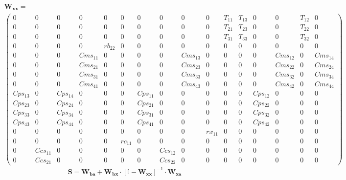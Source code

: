 \begin{multline*} \mathbf{W_{xx}}=\\\left(\begin{smallmatrix} 0 & 0 & 0 & 0 & 0 & 0 &
0 & 0 & 0 & 0 & T_{11} & T_{13} & 0 & 0 & T_{12} & 0 \\ 0 & 0 & 0 & 0
& 0 & 0 & 0 & 0 & 0 & 0 & T_{21} & T_{23} & 0 & 0 & T_{22} & 0 \\ 0 &
0 & 0 & 0 & 0 & 0 & 0 & 0 & 0 & 0 & T_{31} & T_{33} & 0 & 0 & T_{32} &
0 \\ 0 & 0 & 0 & 0 & rb_{22} & 0 & 0 & 0 & 0 & 0 & 0 & 0 & 0 & 0 & 0 &
0 \\ 0 & 0 & 0 & Cms_{11} & 0 & 0 & 0 & 0 & Cms_{13} & 0 & 0 & 0 & 0 &
Cms_{12} & 0 & Cms_{14} \\ 0 & 0 & 0 & Cms_{21} & 0 & 0 & 0 & 0 &
Cms_{23} & 0 & 0 & 0 & 0 & Cms_{22} & 0 & Cms_{24} \\ 0 & 0 & 0 &
Cms_{31} & 0 & 0 & 0 & 0 & Cms_{33} & 0 & 0 & 0 & 0 & Cms_{32} & 0 &
Cms_{34} \\ 0 & 0 & 0 & Cms_{41} & 0 & 0 & 0 & 0 & Cms_{43} & 0 & 0 &
0 & 0 & Cms_{42} & 0 & Cms_{44} \\ Cps_{13} & 0 & Cps_{14} & 0 & 0 & 0
& Cps_{11} & 0 & 0 & 0 & 0 & 0 & Cps_{12} & 0 & 0 & 0 \\ Cps_{23} & 0
& Cps_{24} & 0 & 0 & 0 & Cps_{21} & 0 & 0 & 0 & 0 & 0 & Cps_{22} & 0 &
0 & 0 \\ Cps_{33} & 0 & Cps_{34} & 0 & 0 & 0 & Cps_{31} & 0 & 0 & 0 &
0 & 0 & Cps_{32} & 0 & 0 & 0 \\ Cps_{43} & 0 & Cps_{44} & 0 & 0 & 0 &
Cps_{41} & 0 & 0 & 0 & 0 & 0 & Cps_{42} & 0 & 0 & 0 \\ 0 & 0 & 0 & 0 &
0 & 0 & 0 & 0 & 0 & rx_{11} & 0 & 0 & 0 & 0 & 0 & 0 \\ 0 & 0 & 0 & 0 &
0 & rc_{11} & 0 & 0 & 0 & 0 & 0 & 0 & 0 & 0 & 0 & 0 \\ 0 & Ccs_{11} &
0 & 0 & 0 & 0 & 0 & Ccs_{12} & 0 & 0 & 0 & 0 & 0 & 0 & 0 & 0 \\ 0 &
Ccs_{21} & 0 & 0 & 0 & 0 & 0 & Ccs_{22} & 0 & 0 & 0 & 0 & 0 & 0 & 0 &
0 \end{smallmatrix}\right)\end{multline*}
\[ \mathbf{S}=\mathbf{W_{ba}}+\mathbf{W_{bx}}\cdot\left[ \mathbb{I}
-\mathbf{W_{xx}}\right]^{-1}\cdot\mathbf{W_{xa}} \]
